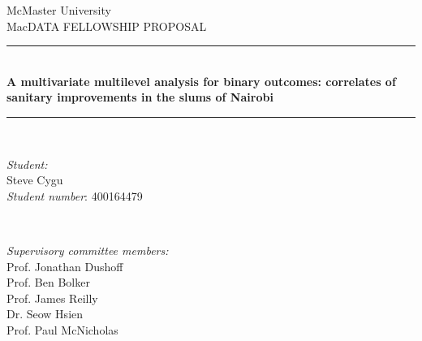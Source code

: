 \documentclass{aimsessay}
\theoremstyle{plain}
\theoremstyle{definition}
\begin{document}
\begin{titlepage}

\newcommand{\HRule}{\rule{\linewidth}{0.5mm}} %

\center %


\LARGE McMaster University\\[1.5cm] %
\Large MacDATA FELLOWSHIP PROPOSAL\\[0.5cm] %


\HRule \\[0.4cm]
{ \Huge \bfseries A multivariate multilevel analysis for binary outcomes: correlates of sanitary improvements in the slums of Nairobi}\\[0.4cm] %
\HRule \\[1.5cm]



\begin{minipage}{0.3\textwidth}
\begin{flushleft} \large
\emph{Student:}\\
Steve Cygu\\
\emph{Student number}: 400164479 %
\end{flushleft}
\end{minipage}
~
\begin{minipage}{0.6\textwidth}
\begin{flushright} \large
\emph{Supervisory committee members:} \\
Prof. Jonathan Dushoff\\ %
Prof. Ben Bolker\\
Prof. James Reilly\\
Dr. Seow Hsien\\
Prof. Paul McNicholas
\end{flushright}
\end{minipage}\\[2cm]


\end{titlepage}
\end{document}
